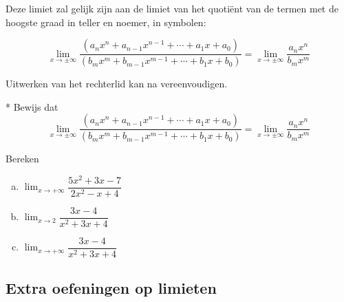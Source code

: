 \documentclass[12pt,twoside,a4paper]{article}
\newenvironment{eigenschap}
{
  \vspace{0.4cm}
  \begin{mdframed}[nobreak=true,frametitle={Eigenschap}]
  }{%
  \end{mdframed}
}
\begin{document}
Deze limiet zal gelijk zijn aan de limiet van het quotiënt van de termen met de hoogste graad in teller en noemer, in symbolen:

\begin{eigenschap}
  $$\lim_{x\to \pm\infty}\dfrac{\left(a_nx^n+a_{n-1}x^{n-1}+\cdots+a_1x+a_0\right)}{\left(b_mx^m+b_{m-1}x^{m-1}+\cdots+b_1x+b_0\right)}=\lim_{x\to \pm\infty}\dfrac{a_nx^n}{b_mx^m}$$
\end{eigenschap}

Uitwerken van het rechterlid kan na vereenvoudigen.

\begin{oefening}*
  Bewijs dat
    $$\lim_{x\to \pm\infty}\dfrac{\left(a_nx^n+a_{n-1}x^{n-1}+\cdots+a_1x+a_0\right)}{\left(b_mx^m+b_{m-1}x^{m-1}+\cdots+b_1x+b_0\right)}=\lim_{x\to \pm\infty}\dfrac{a_nx^n}{b_mx^m}$$

\end{oefening}

\begin{oefening}
  Bereken
  \begin{enumerate}[(a)]
  \itemsep.5em
  \item $\displaystyle\lim_{x\to+\infty}\dfrac{5x^2+3x-7}{2x^2-x+4}$
  \item $\displaystyle\lim_{x\to2}\dfrac{3x-4}{x^2+3x+4}$
  \item $\displaystyle\lim_{x\to+\infty}\dfrac{3x-4}{x^2+3x+4}$
  \end{enumerate}
\end{oefening}

\needspace{3cm}
\subsection{Extra oefeningen op limieten}
\end{document}
